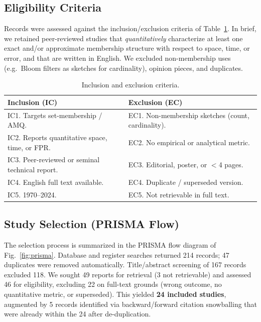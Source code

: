 \documentclass[conference]{IEEEtran}
\begin{document}
\subsection{Eligibility Criteria}
Records were assessed against the inclusion/exclusion criteria of
Table~\ref{tab:criteria}. In brief, we retained peer-reviewed studies that
\emph{quantitatively} characterize at least one exact and/or approximate
membership structure with respect to space, time, or error, and that are
written in English. We excluded non-membership uses (e.g.\ Bloom filters as
sketches for cardinality), opinion pieces, and duplicates.

\begin{table}[!t]
\caption{Inclusion and exclusion criteria.}
\label{tab:criteria}
\centering
\renewcommand{\arraystretch}{1.15}
\footnotesize
\begin{tabular}{@{}p{}p{}@{}}
\toprule
\textbf{Inclusion (IC)} & \textbf{Exclusion (EC)} \\
\midrule
IC1. Targets set-membership / AMQ. &
EC1. Non-membership sketches (count, cardinality). \\
IC2. Reports quantitative space, time, or FPR. &
EC2. No empirical or analytical metric. \\
IC3. Peer-reviewed or seminal technical report. &
EC3. Editorial, poster, or $<$4 pages. \\
IC4. English full text available. &
EC4. Duplicate / superseded version. \\
IC5. 1970--2024. &
EC5. Not retrievable in full text. \\
\bottomrule
\end{tabular}
\end{table}

\subsection{Study Selection (PRISMA Flow)}
The selection process is summarized in the PRISMA flow diagram of
Fig.~\ref{fig:prisma}. Database and register searches returned 214 records; 47
duplicates were removed automatically. Title/abstract screening of 167 records
excluded 118. We sought 49 reports for retrieval (3 not retrievable) and
assessed 46 for eligibility, excluding 22 on full-text grounds (wrong outcome,
no quantitative metric, or superseded). This yielded \textbf{24 included
studies}, augmented by 5 records identified via backward/forward citation
snowballing that were already within the 24 after de-duplication.
\end{document}
